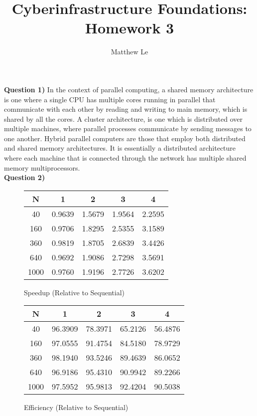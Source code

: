 \documentclass[11pt]{article}
\title{Cyberinfrastructure Foundations: Homework 3}
\author{Matthew Le}
\begin{document}
\maketitle


{\bf Question 1)} In the context of parallel computing, a shared memory architecture is one where a single CPU has multiple cores running in parallel that communicate with each other by reading and writing to main memory, which is shared by all the cores.  A cluster architecture, is one which is distributed over multiple machines, where parallel processes communicate by sending messages to one another.  Hybrid parallel computers are those that employ both distributed and shared memory architectures.  It is essentially a distributed architecture where each machine that is connected through the network has multiple shared memory multiprocessors. \\
{\bf Question 2)}
\begin{figure}[h]
\centering
\begin{tabular}{|c|c|c|c|c|}
\hline
N & 1 & 2 & 3 & 4 \\\hline
40 &  0.9639   & 1.5679  &  1.9564   & 2.2595 \\\hline
 160 &   0.9706   & 1.8295   & 2.5355   & 3.1589 \\\hline
360 &   0.9819    & 1.8705   & 2.6839   & 3.4426\\\hline
640 &    0.9692    & 1.9086    &2.7298    &3.5691\\\hline
 1000&   0.9760   &  1.9196    &2.7726    &3.6202\\\hline
\end{tabular}
\caption{Speedup (Relative to Sequential)}
\end{figure}


\begin{figure}[h]
\centering
\begin{tabular}{|c|c|c|c|c|}
\hline
N & 1 & 2 & 3 & 4 \\\hline
40 & 96.3909  & 78.3971 &  65.2126  & 56.4876\\\hline
160 &   97.0555&   91.4754&   84.5180&   78.9729\\\hline
360 &   98.1940   &93.5246  & 89.4639   &86.0652\\\hline
640 &   96.9186  & 95.4310  & 90.9942  & 89.2266\\\hline
1000 &   97.5952  & 95.9813  &  92.4204 &  90.5038\\\hline

\end{tabular}
\caption{Efficiency (Relative to Sequential)}
\end{figure}
\end{document}
